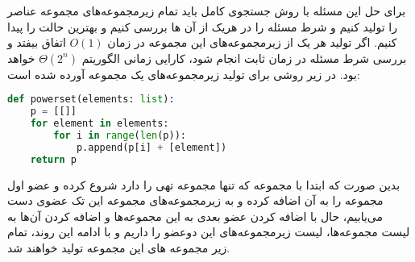 \documentclass[]{article}
\begin{document}
برای حل این مسئله با روش جستجوی کامل باید تمام زیرمجموعه‌های مجموعه عناصر را
تولید کنیم و شرط مسئله را در هریک از آن ها بررسی کنیم و بهترین حالت را پیدا کنیم.
اگر تولید هر یک از زیرمجموعه‌های این مجموعه در زمان $O(1)$
اتفاق بیفتد و بررسی شرط مسئله در زمان ثابت انجام شود، کارایی زمانی الگوریتم $\Theta(2^n)$
خواهد بود.
در زیر روشی برای تولید زیرمجموعه‌های یک مجموعه آورده شده است:

\begin{latin}
\begin{lstlisting}[language=Python, caption=Python Powerset Implementation]
def powerset(elements: list):
    p = [[]]
    for element in elements:
        for i in range(len(p)):
            p.append(p[i] + [element])
    return p
\end{lstlisting}
\end{latin}

بدین صورت که ابتدا با مجموعه که تنها مجموعه تهی را دارد شروع کرده و عضو اول مجموعه را به آن اضافه کرده
و به زیرمجموعه‌های مجموعه این تک عضوی دست می‌یابیم، حال با اضافه کردن عضو بعدی به این مجموعه‌ها
و اضافه کردن آن‌ها به لیست مجموعه‌ها، لیست زیرمجموعه‌های این دوعضو را داریم و با ادامه این روند،
تمام زیر مجموعه های این مجموعه تولید خواهند شد. 
\end{document}
